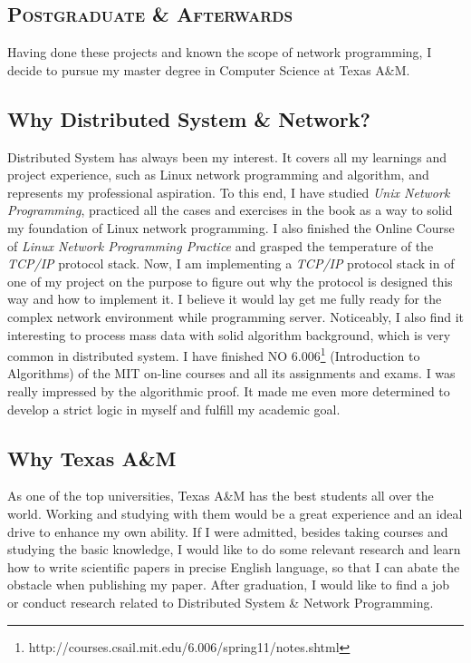 \documentclass{article}
\begin{document}
\begin{multicols}{2}
		\section{\textsc{Postgraduate \& Afterwards}}
		Having done these projects and known the scope of network programming, I decide to pursue my master degree in Computer Science at Texas A\&M.
		\subsection{Why Distributed System \& Network?}
		Distributed System has always been my interest. It covers all my learnings and project experience, such as Linux network programming and algorithm, and represents my professional aspiration. To this end, I have studied \textit{Unix Network Programming}, practiced all the cases and exercises in the book as a way to solid my foundation of Linux network programming. I also finished the Online Course of \textit{Linux Network Programming Practice} and grasped the temperature of the \textit{TCP/IP} protocol stack. Now, I am implementing a \textit{TCP/IP} protocol stack in of one of my project on the purpose to figure out why the protocol is designed this way and how to implement it. I believe it would lay get me fully ready for the complex network environment while programming server.
		Noticeably, I also find it interesting to process mass data with solid algorithm background, which is very common in distributed system. I have finished NO 6.006\footnote{http://courses.csail.mit.edu/6.006/spring11/notes.shtml} (Introduction to Algorithms) of the MIT on-line courses and all its assignments and exams. I was really impressed by the algorithmic proof. It made me even more determined to develop a strict logic in myself and fulfill my academic goal.
		\subsection{Why Texas A\&M}
		As one of the top universities, Texas A\&M has the best students all over the world. Working and studying with them would be a great experience and an ideal drive to enhance my own ability.
		If I were admitted, besides taking courses and studying the basic knowledge, I would like to do some relevant research and learn how to write scientific papers in precise English language, so that I can abate the obstacle when publishing my paper.
		After graduation, I would like to find a job or conduct research related to Distributed System \& Network Programming.
	\end{multicols}
\end{document}
